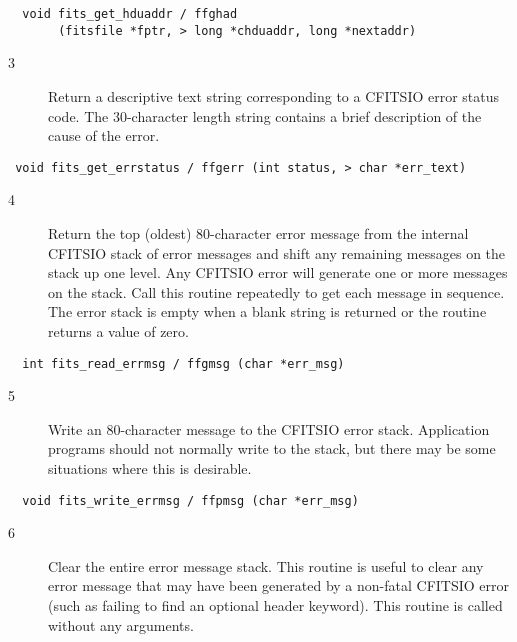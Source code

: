 \begin{verbatim}
  void fits_get_hduaddr / ffghad
       (fitsfile *fptr, > long *chduaddr, long *nextaddr)
\end{verbatim}

\begin{description}
\item[3 ] Return a descriptive text string corresponding to a CFITSIO error
    status code.   The 30-character length string contains a brief
   description of the cause of the error.
\end{description}

\begin{verbatim}
 void fits_get_errstatus / ffgerr (int status, > char *err_text)
\end{verbatim}

\begin{description}
\item[4 ] Return the top (oldest) 80-character error message from the
    internal CFITSIO stack of error messages and shift any remaining
    messages on the stack up one level.  Any CFITSIO error will
    generate one or more messages on the stack.  Call this routine
    repeatedly to get each message in sequence.  The error stack is empty
   when a blank string is returned or the routine returns a value of zero.
\end{description}

\begin{verbatim}
  int fits_read_errmsg / ffgmsg (char *err_msg)
\end{verbatim}

\begin{description}
\item[5 ] Write an 80-character message to the CFITSIO error stack.  Application
    programs should not normally write to the stack, but there may be
   some situations where this is desirable.
\end{description}

\begin{verbatim}
  void fits_write_errmsg / ffpmsg (char *err_msg)
\end{verbatim}

\begin{description}
\item[6 ]  Clear the entire error message stack.  This routine is useful
     to clear any error message that may have been generated by
     a non-fatal CFITSIO error (such as failing to find an optional
    header keyword).  This routine is called without any arguments.
\end{description}

